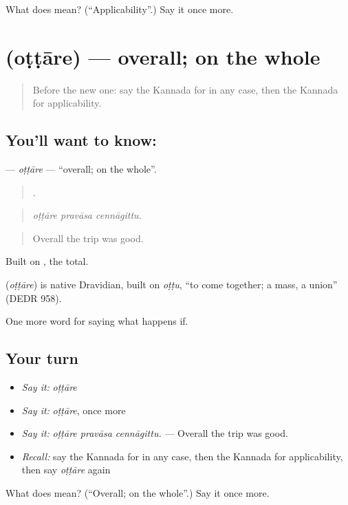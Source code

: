 \begin{tcolorbox}[breakable,colback=teal!4,colframe=teal!35!black,title={Before you move on}]
What does  mean? (\textquotedblleft{}Applicability\textquotedblright{}.) Say it once more.
\end{tcolorbox}
\section[\texorpdfstring{\kn{ಒಟ್ಟಾರೆ} (oṭṭāre)}{ಒಟ್ಟಾರೆ (oṭṭāre)}]{ (oṭṭāre) — overall; on the whole}

\label{lesson:KA-C428-ottare}



\begin{quote}
Before the new one: say the Kannada for in any case, then the Kannada for applicability.
\end{quote}

\subsection*{You'll want to know: }
\textbf{} — \emph{oṭṭāre} — \textquotedblleft{}overall; on the whole\textquotedblright{}.

\begin{quote}
  .
\end{quote}

\begin{quote}
\emph{oṭṭāre pravāsa cennāgittu.}
\end{quote}

\begin{quote}
Overall the trip was good.
\end{quote}

Built on , the total.

\begin{cousinweb}
\textbf{} (\emph{oṭṭāre}) is native Dravidian, built on \emph{oṭṭu}, \textquotedblleft{}to come together; a mass, a union\textquotedblright{} (DEDR 958).
\end{cousinweb}

\begin{grammarlens}[title={What you've built}]
One more word for saying what happens if.
\end{grammarlens}

\subsection*{Your turn}
\begin{itemize}
\raggedright
  \item \emph{Say it:} \emph{oṭṭāre}
  \item \emph{Say it:} \emph{oṭṭāre}, once more
  \item \emph{Say it:} \emph{oṭṭāre pravāsa cennāgittu.} — Overall the trip was good.
  \item \emph{Recall:} say the Kannada for in any case, then the Kannada for applicability, then say \emph{oṭṭāre} again
\end{itemize}

\begin{tcolorbox}[breakable,colback=teal!4,colframe=teal!35!black,title={Before you move on}]
What does  mean? (\textquotedblleft{}Overall; on the whole\textquotedblright{}.) Say it once more.
\end{tcolorbox}
